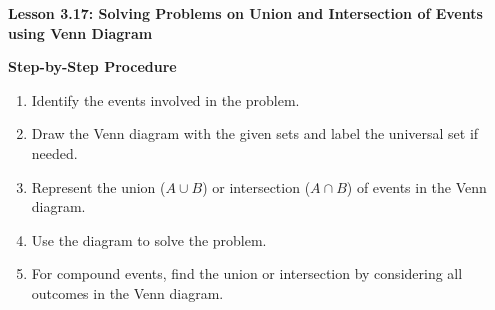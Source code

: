\begin{center}
\textbf{Lesson 3.17: Solving Problems on Union and Intersection of Events using Venn Diagram}
\end{center}

\vspace*{-1.5ex}

\noindent\textbf{Step-by-Step Procedure}

\begin{enumerate}
    \item Identify the events involved in the problem.
    \item Draw the Venn diagram with the given sets and label the universal set if needed.
    \item Represent the union (\(A \cup B\)) or intersection (\(A \cap B\)) of events in the Venn diagram.
    \item Use the diagram to solve the problem.
    \item For compound events, find the union or intersection by considering all outcomes in the Venn diagram.
\end{enumerate}

